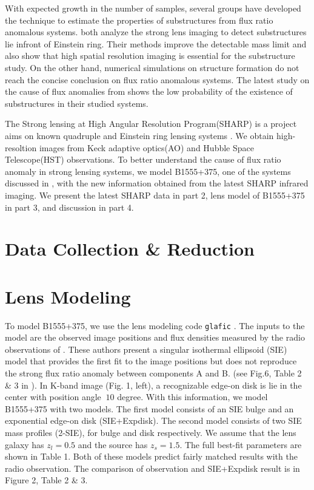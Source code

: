\documentclass[manuscript]{emulateapj}
\begin{document}
	With expected growth in the number of samples, several groups have developed the technique to estimate the properties of substructures from flux ratio anomalous systems. \citet{V09, H13} both analyze the strong lens imaging to detect substructures lie infront of Einstein ring. Their methods improve the detectable mass limit and also show that high spatial resolution imaging is essential for the substructure study. On the other hand, numerical simulations on structure formation do not reach the concise conclusion on flux ratio anomalous systems. The latest study on the cause of flux anomalies from \citet{Xu14} shows the low probability of the existence of substructures in their studied systems. 
	
	The Strong lensing at High Angular Resolution Program(SHARP) is a project aims on known quadruple and Einstein ring lensing systems \citep{SHARP12}. We obtain high-resoltion images from Keck adaptive optics(AO) and Hubble Space Telescope(HST) observations. To better understand the cause of flux ratio anomaly in strong lensing systems, we model B1555+375, one of the systems discussed in \citet{Xu14}, with the new information obtained from the latest SHARP infrared imaging. We present the latest SHARP data in part 2, lens model of B1555+375 in part 3, and discussion in part 4. 

\section{Data Collection \& Reduction}

\section{Lens Modeling}
To model B1555+375, we use the lens modeling code {\tt glafic}
\citep{Oguri}.  The inputs to the model are the observed image positions
and flux densities measured by the radio observations of \citet{Marlow}.
These authors present a singular isothermal ellipsoid (SIE) model that
provides the first fit to the image positions but
does not reproduce the strong flux ratio anomaly between components A and B.
(see Fig.6, Table 2 \& 3 in \citet{Marlow}). In K-band
image (Fig. 1, left), a recognizable edge-on disk is lie in the center
with position angle $~10$ degree. With this information, we model
B1555+375 with two models. The first model consists of an SIE bulge
and an exponential edge-on disk (SIE+Expdisk). The second model
consists of two SIE mass profiles (2-SIE), for bulge and disk
respectively. We assume that the lens galaxy has $z_{l}=0.5$ and the source has $z_s=1.5$. The full best-fit parameters are shown in Table 1. Both
of these models predict fairly matched results with the radio
observation. The comparison of observation and SIE+Expdisk result is
in Figure 2, Table 2 \& 3.
\end{document}
